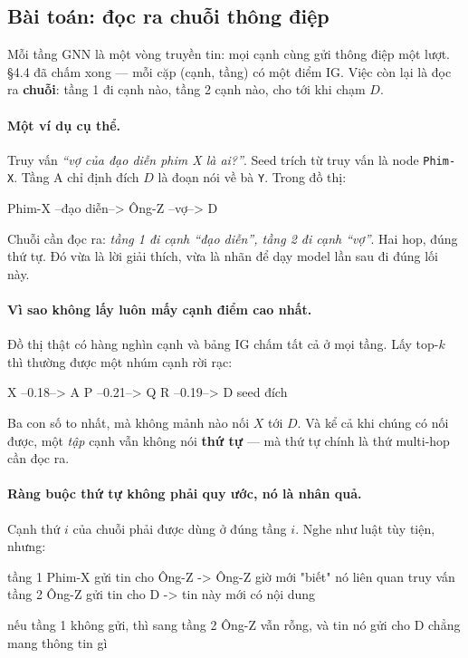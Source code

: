 \documentclass[11pt,a4paper]{article}
\begin{document}
\subsection{Bài toán: đọc ra chuỗi thông điệp}

Mỗi tầng GNN là một vòng truyền tin: mọi cạnh cùng gửi thông điệp một lượt. \S4.4 đã chấm
xong --- mỗi cặp (cạnh, tầng) có một điểm IG. Việc còn lại là đọc ra \textbf{chuỗi}: tầng 1
đi cạnh nào, tầng 2 cạnh nào, cho tới khi chạm $D$.

\paragraph{Một ví dụ cụ thể.} Truy vấn \emph{``vợ của đạo diễn phim X là ai?''}. Seed trích
từ truy vấn là node \texttt{Phim-X}. Tầng A chỉ định đích $D$ là đoạn nói về bà \texttt{Y}.
Trong đồ thị:

\begin{dia}
Phim-X  --đạo diễn-->  Ông-Z  --vợ-->  D
\end{dia}

Chuỗi cần đọc ra: \emph{tầng 1 đi cạnh ``đạo diễn'', tầng 2 đi cạnh ``vợ''}. Hai hop, đúng
thứ tự. Đó vừa là lời giải thích, vừa là nhãn để dạy model lần sau đi đúng lối này.

\paragraph{Vì sao không lấy luôn mấy cạnh điểm cao nhất.} Đồ thị thật có hàng nghìn cạnh và
bảng IG chấm tất cả ở mọi tầng. Lấy top-$k$ thì thường được một nhúm cạnh rời rạc:

\begin{dia}
X --0.18--> A        P --0.21--> Q        R --0.19--> D
seed                                                  đích
\end{dia}

Ba con số to nhất, mà không mảnh nào nối $X$ tới $D$. Và kể cả khi chúng có nối được, một
\emph{tập} cạnh vẫn không nói \textbf{thứ tự} --- mà thứ tự chính là thứ multi-hop cần đọc
ra.

\paragraph{Ràng buộc thứ tự không phải quy ước, nó là nhân quả.} Cạnh thứ $i$ của chuỗi
phải được dùng ở đúng tầng $i$. Nghe như luật tùy tiện, nhưng:

\begin{dia}
tầng 1   Phim-X gửi tin cho Ông-Z    ->  Ông-Z giờ mới "biết" nó liên quan truy vấn
tầng 2   Ông-Z gửi tin cho D         ->  tin này mới có nội dung

nếu tầng 1 không gửi, thì sang tầng 2 Ông-Z vẫn rỗng,
và tin nó gửi cho D chẳng mang thông tin gì
\end{dia}
\end{document}
